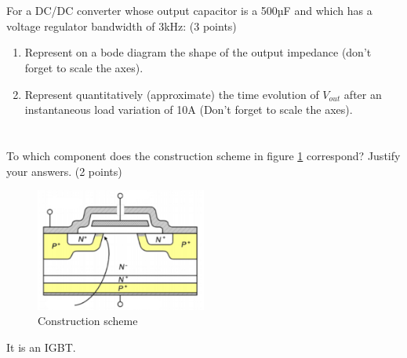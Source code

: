 \documentclass[en]{sourcefiles/eplexam} %
\begin{document}
\nosolution


\section{}
For a DC/DC converter whose output capacitor is a 500µF and which has a voltage regulator bandwidth of 3kHz: (3 points)

\begin{enumerate}
    \item Represent on a bode diagram the shape of the output impedance (don't forget to scale the axes).
    
    \item Represent quantitatively (approximate) the time evolution of $V_{out}$ after an instantaneous load variation of 10A (Don't forget to scale the axes).
\end{enumerate}

\nosolution


\section{}
To which component does the construction scheme in figure \ref{fig:IGBT} correspond? Justify your answers. (2 points)

\begin{figure}[h]
    \centering
    \includegraphics[width=0.5\textwidth]{IGBT.jpg}
    \caption{Construction scheme}
    \label{fig:IGBT}
\end{figure}


\begin{solution}
It is an IGBT.
\end{solution}
\end{document}
